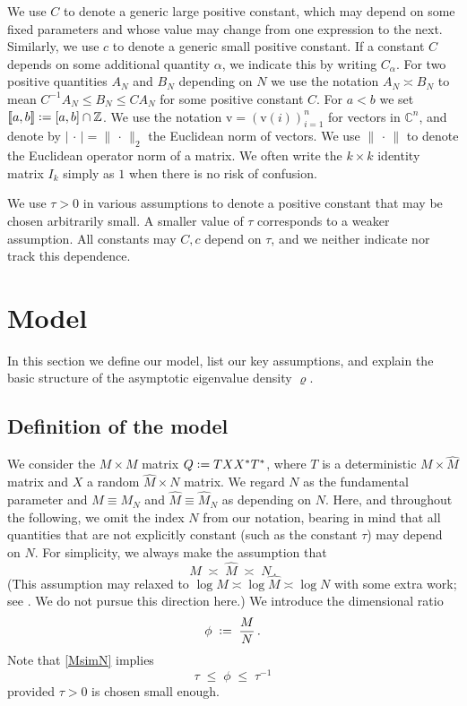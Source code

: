 \documentclass[11pt]{article} %
\newcommand{\nc}{\normalcolor}
\numberwithin{equation}{section}
\numberwithin{figure}{section}
\theoremstyle{plain} %
\theoremstyle{definition} %
\newcommand{\f}[1]{\boldsymbol{\mathrm{#1}}} %
\newcommand{\wh}{\widehat}
\newcommand{\C}{\mathbb{C}}
\newcommand{\Z}{\mathbb{Z}}
\newcommand*{\deq}{\mathrel{\vcenter{\baselineskip0.65ex \lineskiplimit0pt \hbox{.}\hbox{.}}}=}
\renewcommand{\leq}{\leqslant}
\newcommand{\qq}[1]{[\![{#1}]\!]}
\newcommand{\abs}[1]{\lvert #1 \rvert}
\newcommand{\norm}[1]{\lVert #1 \rVert}
\begin{document}
We use $C$ to denote a generic large positive constant, which may depend on some fixed parameters and whose value may change from one expression to the next. Similarly, we use $c$ to denote a generic small positive constant. If a constant $C$ depends on some additional quantity $\alpha$, we indicate this by writing $C_\alpha$. For two positive quantities $A_N$ and $B_N$ depending on $N$ we use the notation $A_N \asymp B_N$ to mean $C^{-1} A_N \leq B_N \leq C A_N$ for some positive constant $C$. For $a < b$ we set $\qq{a,b} \deq [a,b] \cap \Z$. We use the notation $\f v = (\f v(i))_{i = 1}^n$ for vectors in $\C^n$, and denote by $\abs{\,\cdot\,}= \norm{\,\cdot\,}_2$ the Euclidean norm of vectors. We use $\norm{\,\cdot\,}$ to denote the Euclidean operator norm of a matrix. We often write the $k \times k$ identity matrix $I_k$ simply as $1$ when there is no risk of confusion.


We use $\tau > 0$ in various assumptions to denote a positive constant that may be chosen arbitrarily small. A smaller value of $\tau$ corresponds to a weaker assumption. All constants may $C,c$ depend on $\tau$, and we neither indicate nor track this dependence.


\section{Model} \label{sec:model}


In this section we define our model, list our key assumptions, and explain the basic structure of the asymptotic eigenvalue density $\varrho$.


\subsection{Definition of the model} \label{sec:def_model}
We consider the $M \times M$ matrix $Q \deq T X X^* T^*$, where $T$ is a deterministic $M \times \wh M$ matrix and $X$ a random $\wh M \times N$ matrix. We regard $N$ as the fundamental parameter and $M \equiv M_N$ and $\wh M \equiv \wh M_N$ as depending on $N$. Here, and throughout the following, we omit the index $N$ from our notation, bearing in mind that all quantities that are not explicitly constant (such as the constant $\tau$) may depend on $N$. For simplicity, we always make the assumption that
\begin{equation} \label{MsimN}
M \;\asymp\; \wh M \;\asymp\; N\,.
\end{equation} 
(This assumption may relaxed to $\log M \asymp \log \wh M \asymp \log N$ with some extra work; see \cite{KYY}. We do not pursue this direction here.) \nc We introduce the dimensional ratio
\begin{equation} \label{def_phi}
\phi \;\deq\; \frac{M}{N}\,.
\end{equation}
Note that \eqref{MsimN} implies
\begin{equation} \label{phi_bounded}
\tau \;\leq\; \phi \;\leq\; \tau^{-1}
\end{equation}
provided $\tau > 0$ is chosen small enough.
\end{document}
